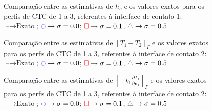 \begin{figure}[h!b]
	\caption{Comparação entre as estimativas de $h_c$ e os valores exatos para os perfis de CTC de 1 a 3, referentes à interface de contato 1: $\text{--} \rightarrow \text{Exato}$; $\textcolor{blue}{\ocircle} \rightarrow \sigma = 0.0$; $\textcolor{red}{\square} \rightarrow \sigma = 0.1$, $\textcolor{gray}{\triangle} \rightarrow \sigma = 0.5$}
\end{figure}


\newpage
\begin{figure}[h!b]
	\caption{Comparação entre as estimativas de $[T_1 - T_2]_\Gamma$ e os valores exatos para os perfis de CTC de 1 a 3, referentes à interface de contato 2: $\text{--} \rightarrow \text{Exato}$; $\textcolor{blue}{\ocircle} \rightarrow \sigma = 0.0$; $\textcolor{red}{\square} \rightarrow \sigma = 0.1$, $\textcolor{gray}{\triangle} \rightarrow \sigma = 0.5$}
\end{figure}
%
%
\begin{figure}[h!b]
	\caption{Comparação entre as estimativas de $\left[-k_1 \frac{\partial T_1}{\partial\mathbf{n}_1}\right]_\Gamma$ e os valores exatos para os perfis de CTC de 1 a 3, referentes à interface de contato 2: $\text{--} \rightarrow \text{Exato}$; $\textcolor{blue}{\ocircle} \rightarrow \sigma = 0.0$; $\textcolor{red}{\square} \rightarrow \sigma = 0.1$, $\textcolor{gray}{\triangle} \rightarrow \sigma = 0.5$}
\end{figure}
